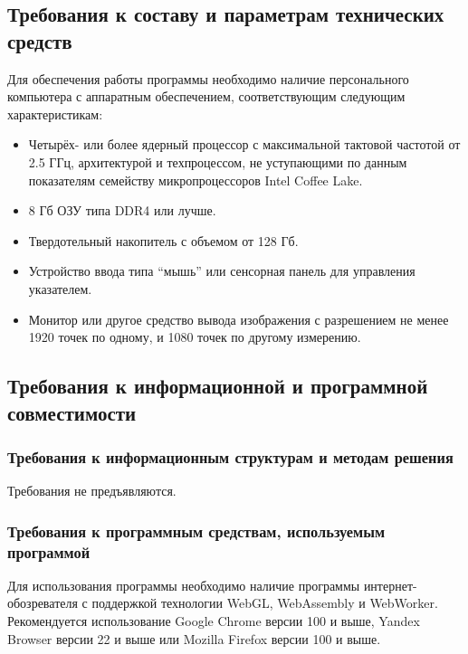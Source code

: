 \documentclass[a4paper, 12pt]{article}
\begin{document}
	\subsection{Требования к составу и параметрам технических средств}\label{section:4.4.4}
	Для обеспечения работы программы необходимо наличие персонального компьютера с аппаратным обеспечением,
	соответствующим следующим характеристикам:
	\begin{itemize}
		\item Четырёх- или более ядерный процессор с максимальной тактовой частотой от 2.5 ГГц, архитектурой и техпроцессом,
			не уступающими по данным показателям семейству микропроцессоров Intel Coffee Lake.

		\item 8 Гб ОЗУ типа DDR4 или лучше.

		\item Твердотельный накопитель с объемом от 128 Гб.

		\item Устройство ввода типа \enquote{мышь} или сенсорная панель для управления указателем.

		\item Монитор или другое средство вывода изображения с разрешением не менее 1920 точек по одному, и 1080 точек по
			другому измерению.
	\end{itemize}

	\subsection{Требования к информационной и программной совместимости}\label{section:4.6}

	\subsubsection{Требования к информационным структурам и методам решения}\label{section:4.6.1}
	Требования не предъявляются.

	\subsubsection{Требования к программным средствам, используемым программой}\label{section:4.6.2}
	Для использования программы необходимо наличие программы интернет-обозревателя с поддержкой технологии WebGL,
	WebAssembly и WebWorker. Рекомендуется использование Google Chrome версии 100 и выше, Yandex Browser версии 22 и выше
	или Mozilla Firefox версии 100 и выше.
\end{document}
